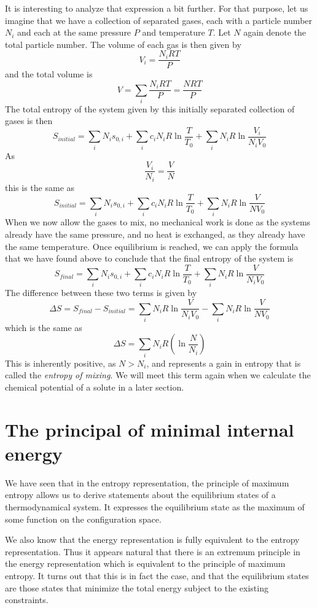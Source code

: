 \documentclass[a4paper, draft]{article}
\theoremstyle{own}
\theoremstyle{remark}
\begin{document}
It is interesting to analyze that expression a bit further. For that purpose, let us imagine that we have a collection of separated gases, each with a particle number $N_i$ and each at the same pressure $P$ and temperature $T$. Let $N$ again denote the total particle number. The volume of each gas is then given by
$$
V_i = \frac{N_i R T}{P} 
$$
and the total volume is 
$$
V = \sum_i \frac{N_i R T}{P}  = \frac{N R T}{P}
$$
The total entropy of the system given by this initially separated collection of gases is then
$$
S_{initial} = \sum_i N_i  s_{0, i} + \sum_i  c_i N_i R \ln   \frac{T}{T_0}  +  \sum_i  N_i R \ln \frac{V_i}{N_i V_0} 
$$
As
$$
\frac{V_i}{N_i} = \frac{V}{N}
$$
this is the same as
$$
S_{initial} = \sum_i N_i  s_{0, i} + \sum_i  c_i N_i R \ln   \frac{T}{T_0}  +  \sum_i  N_i R \ln \frac{V}{N V_0} 
$$
When we now allow the gases to mix, no mechanical work is done as the systems already have the same pressure, and no heat is exchanged, as they already have the same temperature. Once equilibrium is reached, we can apply the formula that we have found above to conclude that the final entropy of the system is
$$
S_{final} = \sum_i N_i  s_{0, i} + \sum_i  c_i N_i R \ln   \frac{T}{T_0}  +  \sum_i  N_i R \ln \frac{V}{N_i V_0} 
$$
The difference between these two terms is given by
$$
\Delta S = S_{final} - S_{initial} = \sum_i  N_i R \ln \frac{V}{N_i V_0}  - \sum_i  N_i R \ln \frac{V}{N V_0} 
$$
which is the same as
$$
\Delta S = \sum_i  N_i R ( \ln \frac{N}{N_i })
$$
This is inherently positive, as $N > N_i$, and represents a gain in entropy that is called the {\em entropy of mixing}. We will meet this term again when we calculate the chemical potential of a solute in a later section.

\section{The principal of minimal internal energy}\label{sec:minimalinternalenergy}

We have seen that in the entropy representation, the principle of maximum entropy allows us to derive statements about the equilibrium states of a thermodynamical system. It expresses the equilibrium state as the maximum of some function on the configuration space.

We also know that the energy representation is fully equivalent to the entropy representation. Thus it appears natural that there is an extremum principle in the energy representation which is equivalent to the principle of maximum entropy. It turns out that this is in fact the case, and that the equilibrium states are those states that minimize the total energy subject to the existing constraints.
\end{document}
